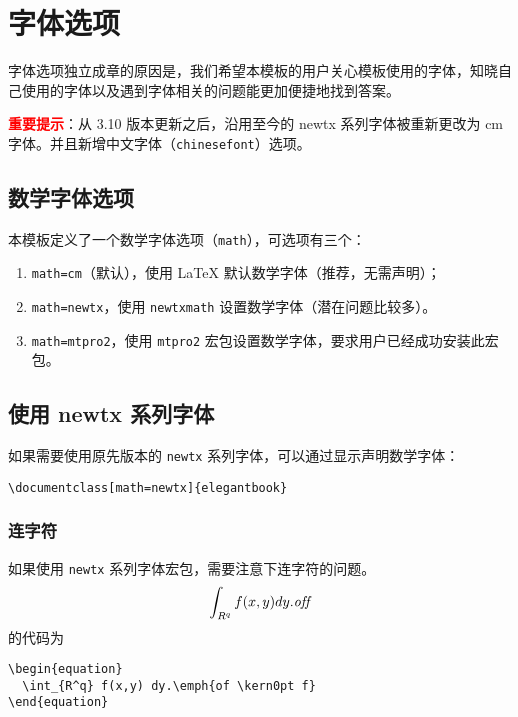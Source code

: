\documentclass[cn,10pt,math=newtx,citestyle=gb7714-2015,bibstyle=gb7714-2015]{elegantbook}
\begin{document}
\chapter{字体选项}
字体选项独立成章的原因是，我们希望本模板的用户关心模板使用的字体，知晓自己使用的字体以及遇到字体相关的问题能更加便捷地找到答案。

\textcolor{red}{\bfseries 重要提示}：从 3.10 版本更新之后，沿用至今的 newtx 系列字体被重新更改为 cm 字体。并且新增中文字体（\lstinline{chinesefont}）选项。

\section{数学字体选项}

本模板定义了一个数学字体选项（\lstinline{math}），可选项有三个：
\begin{enumerate}
  \item \lstinline{math=cm}（默认），使用 \LaTeX{} 默认数学字体（推荐，无需声明）；
  \item \lstinline{math=newtx}，使用 \lstinline{newtxmath} 设置数学字体（潜在问题比较多）。
  \item \lstinline{math=mtpro2}，使用 \lstinline{mtpro2} 宏包设置数学字体，要求用户已经成功安装此宏包。
\end{enumerate}

\section{使用 newtx 系列字体}

如果需要使用原先版本的 \lstinline{newtx} 系列字体，可以通过显示声明数学字体：

\begin{lstlisting}
\documentclass[math=newtx]{elegantbook}
\end{lstlisting}

\subsection{连字符}

如果使用 \lstinline{newtx} 系列字体宏包，需要注意下连字符的问题。
\begin{equation}
  \int_{R^q} f(x,y) dy.\emph{of\kern0pt f}
\end{equation}
的代码为
\begin{lstlisting}
\begin{equation}
  \int_{R^q} f(x,y) dy.\emph{of \kern0pt f}
\end{equation}
\end{lstlisting}
\end{document}

